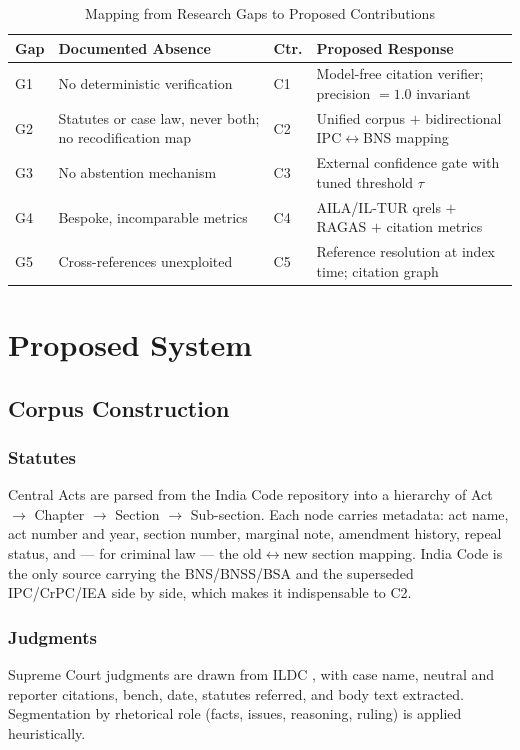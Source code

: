 \documentclass[conference]{IEEEtran}
\begin{document}
\begin{table}[t]
\caption{Mapping from Research Gaps to Proposed Contributions}
\label{tab:gaps}
\centering
\footnotesize
\begin{tabular}{@{}p{0.6cm}p{3.0cm}p{0.6cm}p{3.1cm}@{}}
\toprule
\textbf{Gap} & \textbf{Documented Absence} & \textbf{Ctr.} & \textbf{Proposed Response} \\
\midrule
G1 & No deterministic verification & C1 & Model-free citation verifier; precision $=1.0$ invariant \\
\addlinespace
G2 & Statutes or case law, never both; no recodification map & C2 & Unified corpus $+$ bidirectional IPC$\leftrightarrow$BNS mapping \\
\addlinespace
G3 & No abstention mechanism & C3 & External confidence gate with tuned threshold $\tau$ \\
\addlinespace
G4 & Bespoke, incomparable metrics & C4 & AILA/IL-TUR qrels $+$ RAGAS $+$ citation metrics \\
\addlinespace
G5 & Cross-references unexploited & C5 & Reference resolution at index time; citation graph \\
\bottomrule
\end{tabular}
\end{table}

\section{Proposed System}
\label{sec:proposed}

\subsection{Corpus Construction}

\subsubsection{Statutes} Central Acts are parsed from the India Code repository into a hierarchy of Act $\rightarrow$ Chapter $\rightarrow$ Section $\rightarrow$ Sub-section. Each node carries metadata: act name, act number and year, section number, marginal note, amendment history, repeal status, and — for criminal law — the old$\leftrightarrow$new section mapping. India Code is the only source carrying the BNS/BNSS/BSA and the superseded IPC/CrPC/IEA side by side, which makes it indispensable to C2.

\subsubsection{Judgments} Supreme Court judgments are drawn from ILDC \cite{malik2021}, with case name, neutral and reporter citations, bench, date, statutes referred, and body text extracted. Segmentation by rhetorical role (facts, issues, reasoning, ruling) is applied heuristically.
\end{document}
